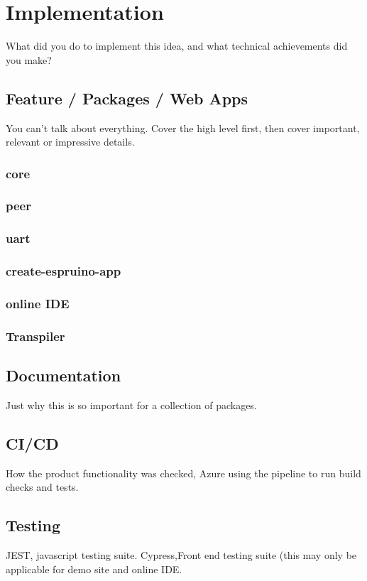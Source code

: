 \documentclass{l4proj}
\begin{document}
\chapter{Implementation}
What did you do to implement this idea, and what technical achievements did you make?
\section{Feature / Packages / Web Apps}
You can't talk about everything. Cover the high level first, then cover important, relevant or impressive details.
\subsection{core}
\subsection{peer}
\subsection{uart}
\subsection{create-espruino-app}
\subsection{online IDE}
\subsection{Transpiler}

\section{Documentation}
\text Just why this is so important for a collection of packages.
\section{CI/CD}
\text How the product functionality was checked, Azure using the pipeline to run build checks and tests.

\section{Testing}
\text JEST, javascript testing suite. Cypress,Front end testing suite (this may only be applicable for demo site and online IDE.
\end{document}
